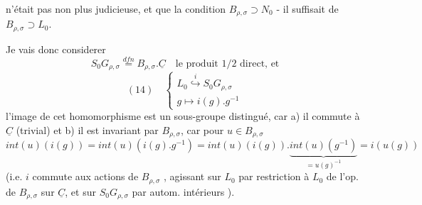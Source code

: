 \begin{enumerate}
\newpage



\newpage



\newpage



\newpage



\newpage



\newpage



\newpage



\newpage



\newpage



\newpage


n'était pas non plus judicieuse, et que la
condition $B_{\rho,\sigma} \supset N_0$ - il suffisait de $B_{\rho,\sigma} \supset L_0$.

Je vais donc considerer
$$ S_0 G_{\rho,\sigma} \overset{dfn}{=} B_{\rho,\sigma} . \underline{C} \quad \text{le produit 1/2 direct, et} $$
$$ (14) \quad \begin{cases} L_0 \overset{i}{\hookrightarrow} S_0 G_{\rho,\sigma} \\ g \longmapsto i(g).g^{-1} \end{cases} $$
l'image de cet homomorphisme est un sous-groupe
distingué, car a) il commute à $\underline{C}$ (trivial) et
b) il est invariant par $B_{\rho,\sigma}$, car pour $u \in B_{\rho,\sigma}$
$$ int(u)(i(g)) = int(u) (i(g).g^{-1}) = int(u)(i(g)) . \underbrace{int(u)(g^{-1})}_{=u(g)^{-1}} = i(u(g)) $$
(i.e. $i$ commute aux actions de $B_{\rho,\sigma}$ , agissant sur
$L_0$ par restriction à $L_0$ de l'op. de $B_{\rho,\sigma}$ sur
$\underline{C}$, et sur $S_0 G_{\rho,\sigma}$ par autom. intérieurs ).


\end{enumerate}
